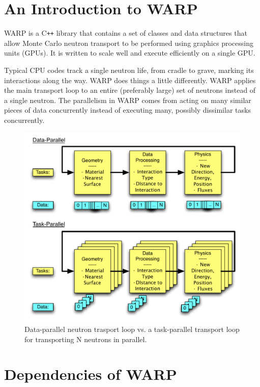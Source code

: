 \documentclass[twoside,a4paper]{refart}
\begin{document}
\section{An Introduction to WARP}

WARP is a C\texttt{++} library that contains a set of classes and data structures that allow Monte Carlo 
neutron transport to be performed using graphics processing units (GPUs).  It is written to scale well and
execute efficiently on a single GPU.

Typical CPU codes track a single neutron life, from cradle to grave, marking its interactions along the 
way. WARP does things a little differently.  WARP applies the main transport loop to an entire (preferably
large) set of neutrons instead of a single neutron.  The parallelism in WARP comes from acting on many 
similar pieces of data concurrently instead of executing many, possibly dissimilar tasks concurrently.

\begin{figure}[h!] 
  \centering
    \includegraphics[width=\textwidth]{graphics/datavtask.pdf}
     \caption{Data-parallel neutron trasport loop vs. a task-parallel transport loop for transporting N neutrons in parallel.  \label{datavtask} }
\end{figure}

\section{Dependencies of WARP}
\label{sec:dependencies}
\end{document}
